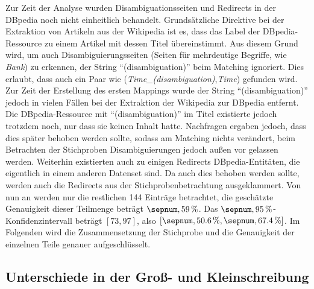 Zur Zeit der Analyse wurden Disambiguationsseiten und Redirects in der DBpedia noch nicht einheitlich behandelt.
Grundsätzliche Direktive bei der Extraktion von Artikeln aus der Wikipedia ist es, dass das Label der DBpedia-Ressource zu einem Artikel mit dessen Titel übereinstimmt.
Aus diesem Grund wird, um auch Disambiguierungsseiten (Seiten für mehrdeutige Begriffe, wie \zb{} \emph{Bank}) zu erkennen, der String "`(disambiguation)"' beim Matching ignoriert.
Dies erlaubt, dass auch ein Paar wie (\emph{Time\_(disambiguation)},\emph{Time}) gefunden wird. Zur Zeit der Erstellung des ersten Mappings wurde der String "`(disambiguation)"' jedoch in vielen Fällen 
bei der Extraktion der Wikipedia zur DBpedia entfernt. Die DBpedia-Ressource mit "`(disambiguation)"' im Titel existierte jedoch trotzdem noch, nur dass sie keinen Inhalt hatte.
Nachfragen ergaben jedoch, dass dies später behoben werden sollte, sodass am Matching nichts verändert, beim Betrachten der Stichproben Disambiguierungen jedoch außen vor gelassen werden.
Weiterhin existierten auch zu einigen Redirects DBpedia-Entitäten, die eigentlich in einem anderen Datenset sind. Da auch dies behoben werden sollte, werden auch die Redirects aus der Stichprobenbetrachtung
ausgeklammert.
Von nun an werden nur die restlichen 144 Einträge betrachtet, die geschätzte Genauigkeit dieser Teilmenge beträgt $\valunit{59}{\%}$. Das $\valunit{95}{\%}$-Konfidenzintervall beträgt $[73,97]$,
also $[\valunit{50.6}{\%},\valunit{67.4}{\%}]$.
Im Folgenden wird die Zusammensetzung der Stichprobe und die Genauigkeit der einzelnen Teile genauer aufgeschlüsselt.
\subsection{Unterschiede in der Groß- und Kleinschreibung}


